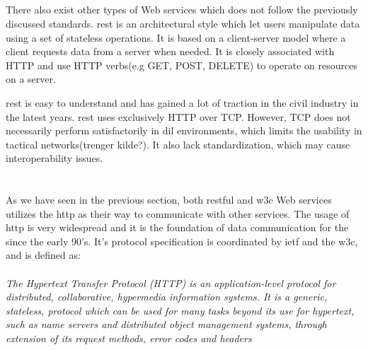 
\subsection{}
\label{rest}

There also exist other types of Web services which does not follow the
previously discussed standards. \gls{rest} is an architectural style which let
users manipulate data using a set of stateless operations. It is based on a
client-server model where a client requests data from a server when needed. It
is closely associated with HTTP and use HTTP verbs(e.g GET, POST,
DELETE) to operate on resources on a server.

 \gls{rest} is easy to understand and has gained a lot of traction in the
civil  industry in the latest years. \gls{rest} uses exclusively HTTP over
TCP.  However, TCP does not necessarily perform satisfactorily in \gls{dil}
environments, which limits the usability in tactical networks(trenger kilde?).
It also lack standardization, which may cause interoperability issues.



\section{}

As we have seen in the previous section, both restful and w3c Web services
utilizes the \gls{http} as their way to communicate with other services. The
usage of \gls{http} is very widespread and it is the foundation of data
communication for the  since the early 90's. It's protocol
specification is coordinated by \gls{ietf} and the \gls{w3c}, and is defined
as\cite{rfc-2616}:

\paragraph{}
\textit{
    The Hypertext Transfer Protocol (HTTP) is an application-level
    protocol for distributed, collaborative, hypermedia information
    systems. It is a generic, stateless, protocol which can be used for
    many tasks beyond its use for hypertext, such as name servers and
    distributed object management systems, through extension of its
    request methods, error codes and headers
}

